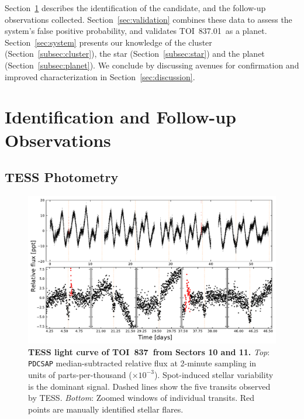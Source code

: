 \documentclass[12pt,twocolumn,tighten]{aastex63}
\newcommand{\tn}{TOI~837} %
\newcommand{\pn}{TOI~837.01} %
\begin{document}
Section~\ref{sec:observations} describes the identification of the
candidate, and the follow-up observations collected.
Section~\ref{sec:validation} combines these data to assess the
system's false positive probability, and validates \pn\ as a planet.
Section~\ref{sec:system} presents our knowledge of the cluster
(Section~\ref{subsec:cluster}), the star (Section~\ref{subsec:star})
and the planet (Section~\ref{subsec:planet}).  We conclude by
discussing avenues for confirmation and improved characterization in
Section~\ref{sec:discussion}.



\section{Identification and Follow-up Observations}
\label{sec:observations}


\subsection{TESS Photometry}
\label{subsec:tess}

\begin{figure}[!t]
	\begin{center}
		\leavevmode
		\includegraphics[width=1\textwidth]{f1.pdf}
	\end{center}
	\vspace{-0.7cm}
	\caption{
    {\bf TESS light curve of \tn\ from Sectors 10 and 11.} {\it Top}:
    \texttt{PDCSAP} median-subtracted relative flux at 2-minute
    sampling in units of parts-per-thousand ($\times 10^{-3}$).
    Spot-induced stellar variability is the dominant signal.  Dashed
    lines show the five transits observed by TESS.  {\it Bottom}:
    Zoomed windows of individual transits.  Red points are manually
    identified stellar flares.
		\label{fig:rawzoom}
	}
\end{figure}
\end{document}
